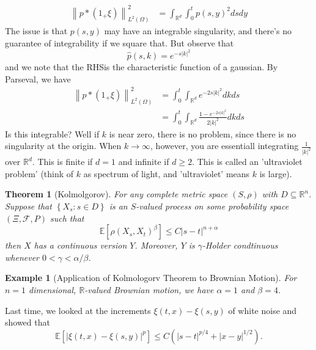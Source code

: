 \documentclass{article}
\newtheorem{theorem}{Theorem}
\newtheorem{example}{Example}
\def\R{\mathbb{R}} %
\def\E{\mathbb{E}} %
\newcommand\norm[1]{\left\lVert#1\right\rVert}
\begin{document}
\begin{align*}
  \norm{p*(1_{+}\xi)}_{L^{2}(\Omega)}^{2}
  &=\int_{\R^d }\int_{0}^{t}p(s,y)^{2}dsdy  
\end{align*}
The issue is that $p(s,y)$ may have an integrable singularity, and there's no
guarantee of integrability if we square that. But observe that
\begin{equation*}
  \hat{p}(s,k) = e^{-s|k|^{2}}
\end{equation*}
and we note that the RHSis the characteristic function of a gaussian. By
Parseval, we have
\begin{align*}
  \norm{p*(1_{+}\xi)}_{L^{2}(\Omega)}^{2}
  &= \int_{0}^{t}\int_{\R^d }e^{-2s|k|^{2}}  dkds\\
  &= \int_{0}^{t}\int_{\R^d }\frac{1-e^{-2s|k|^{2}}}{2|k|^{2}}  dkds
\end{align*}
Is this integrable? Well if $k$ is near zero, there is no problem, since there
is no singularity at the origin. When $k\to\infty$, however, you are essentiall
integrating $\frac{1}{|k|^{2}}$ over $\R^d$.  This is finite if $d=1$ and
infinite if $d \geq 2$. This is called an 'ultraviolet problem' (think of $k$ as
spectrum of light, and 'ultraviolet' means $k$ is large).


\begin{theorem}[Kolmolgorov]
  \label{thm:kolmolgorov}
  For any complete metric space $(S,\rho)$ with $D\subseteq \R^n$. Suppose that
  $\left\{X_{s}:s\in D\right\}$ is an $S$-valued process on some probability
  space $\left( \Xi,\mathcal{F},P \right)$ such that
  \begin{equation*}
    \E\left[\rho(X_{s},X_{t})^{\beta} \right] \leq C \left| s-t \right|^{n+\alpha}
  \end{equation*}
  then $X$ has a continuous version $Y$. Moreover, $Y$ is $\gamma$-Holder
  condtinuous whenever $0<\gamma<\alpha/\beta$. 
\end{theorem}
\begin{example}[Application of Kolmologorv Theorem to Brownian Motion]
  For $n=1$ dimensional, $\R$-valued Brownian motion, we have $\alpha=1$ and
  $\beta=4$.
\end{example}
Last time, we looked at the increments $\xi(t,x)-\xi(s,y)$  of white noise and showed that
\begin{equation*}
  \E\left[\left| \xi(t,x)-\xi(s,y) \right|
    ^{p}\right] \leq C \left( \left| s-t \right|^{p/4}+\left| x-y \right|^{1/2}\right).
\end{equation*}
\end{document}
